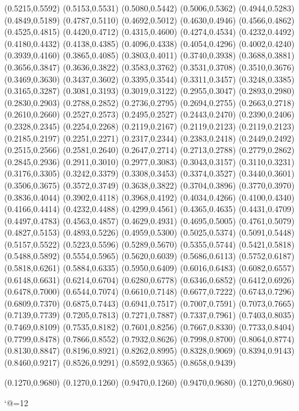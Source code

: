 \PST@Diamond(0.5215,0.5592)
\PST@Diamond(0.5153,0.5531)
\PST@Diamond(0.5080,0.5442)
\PST@Diamond(0.5006,0.5362)
\PST@Diamond(0.4944,0.5283)
\PST@Diamond(0.4849,0.5189)
\PST@Diamond(0.4787,0.5110)
\PST@Diamond(0.4692,0.5012)
\PST@Diamond(0.4630,0.4946)
\PST@Diamond(0.4566,0.4862)
\PST@Diamond(0.4525,0.4815)
\PST@Diamond(0.4420,0.4712)
\PST@Diamond(0.4315,0.4600)
\PST@Diamond(0.4274,0.4534)
\PST@Diamond(0.4232,0.4492)
\PST@Diamond(0.4180,0.4432)
\PST@Diamond(0.4138,0.4385)
\PST@Diamond(0.4096,0.4338)
\PST@Diamond(0.4054,0.4296)
\PST@Diamond(0.4002,0.4240)
\PST@Diamond(0.3939,0.4160)
\PST@Diamond(0.3865,0.4085)
\PST@Diamond(0.3803,0.4011)
\PST@Diamond(0.3740,0.3938)
\PST@Diamond(0.3688,0.3881)
\PST@Diamond(0.3656,0.3847)
\PST@Diamond(0.3636,0.3822)
\PST@Diamond(0.3583,0.3762)
\PST@Diamond(0.3531,0.3708)
\PST@Diamond(0.3510,0.3676)
\PST@Diamond(0.3469,0.3630)
\PST@Diamond(0.3437,0.3602)
\PST@Diamond(0.3395,0.3544)
\PST@Diamond(0.3311,0.3457)
\PST@Diamond(0.3248,0.3385)
\PST@Diamond(0.3165,0.3287)
\PST@Diamond(0.3081,0.3193)
\PST@Diamond(0.3019,0.3122)
\PST@Diamond(0.2955,0.3047)
\PST@Diamond(0.2893,0.2980)
\PST@Diamond(0.2830,0.2903)
\PST@Diamond(0.2788,0.2852)
\PST@Diamond(0.2736,0.2795)
\PST@Diamond(0.2694,0.2755)
\PST@Diamond(0.2663,0.2718)
\PST@Diamond(0.2610,0.2660)
\PST@Diamond(0.2527,0.2573)
\PST@Diamond(0.2495,0.2527)
\PST@Diamond(0.2443,0.2470)
\PST@Diamond(0.2390,0.2406)
\PST@Diamond(0.2328,0.2345)
\PST@Diamond(0.2254,0.2268)
\PST@Diamond(0.2119,0.2167)
\PST@Dashed(0.2119,0.2123)
(0.2119,0.2123)
(0.2185,0.2197)
(0.2251,0.2271)
(0.2317,0.2344)
(0.2383,0.2418)
(0.2449,0.2492)
(0.2515,0.2566)
(0.2581,0.2640)
(0.2647,0.2714)
(0.2713,0.2788)
(0.2779,0.2862)
(0.2845,0.2936)
(0.2911,0.3010)
(0.2977,0.3083)
(0.3043,0.3157)
(0.3110,0.3231)
(0.3176,0.3305)
(0.3242,0.3379)
(0.3308,0.3453)
(0.3374,0.3527)
(0.3440,0.3601)
(0.3506,0.3675)
(0.3572,0.3749)
(0.3638,0.3822)
(0.3704,0.3896)
(0.3770,0.3970)
(0.3836,0.4044)
(0.3902,0.4118)
(0.3968,0.4192)
(0.4034,0.4266)
(0.4100,0.4340)
(0.4166,0.4414)
(0.4232,0.4488)
(0.4299,0.4561)
(0.4365,0.4635)
(0.4431,0.4709)
(0.4497,0.4783)
(0.4563,0.4857)
(0.4629,0.4931)
(0.4695,0.5005)
(0.4761,0.5079)
(0.4827,0.5153)
(0.4893,0.5226)
(0.4959,0.5300)
(0.5025,0.5374)
(0.5091,0.5448)
(0.5157,0.5522)
(0.5223,0.5596)
(0.5289,0.5670)
(0.5355,0.5744)
(0.5421,0.5818)
(0.5488,0.5892)
(0.5554,0.5965)
(0.5620,0.6039)
(0.5686,0.6113)
(0.5752,0.6187)
(0.5818,0.6261)
(0.5884,0.6335)
(0.5950,0.6409)
(0.6016,0.6483)
(0.6082,0.6557)
(0.6148,0.6631)
(0.6214,0.6704)
(0.6280,0.6778)
(0.6346,0.6852)
(0.6412,0.6926)
(0.6478,0.7000)
(0.6544,0.7074)
(0.6610,0.7148)
(0.6677,0.7222)
(0.6743,0.7296)
(0.6809,0.7370)
(0.6875,0.7443)
(0.6941,0.7517)
(0.7007,0.7591)
(0.7073,0.7665)
(0.7139,0.7739)
(0.7205,0.7813)
(0.7271,0.7887)
(0.7337,0.7961)
(0.7403,0.8035)
(0.7469,0.8109)
(0.7535,0.8182)
(0.7601,0.8256)
(0.7667,0.8330)
(0.7733,0.8404)
(0.7799,0.8478)
(0.7866,0.8552)
(0.7932,0.8626)
(0.7998,0.8700)
(0.8064,0.8774)
(0.8130,0.8847)
(0.8196,0.8921)
(0.8262,0.8995)
(0.8328,0.9069)
(0.8394,0.9143)
(0.8460,0.9217)
(0.8526,0.9291)
(0.8592,0.9365)
(0.8658,0.9439)

\PST@Border(0.1270,0.9680)
(0.1270,0.1260)
(0.9470,0.1260)
(0.9470,0.9680)
(0.1270,0.9680)

\catcode`@=12
\fi
\endpspicture
